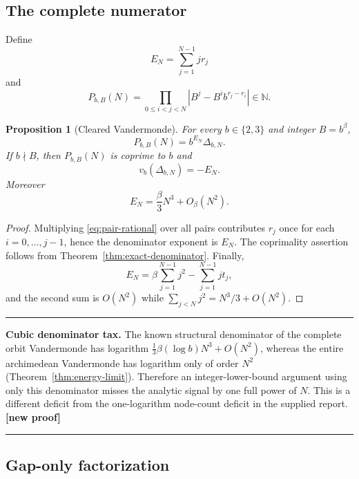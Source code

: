 \documentclass[11pt,oneside]{article}
\newtheorem{proposition}[theorem]{Proposition}
\theoremstyle{definition}
\theoremstyle{remark}
\newcommand{\N}{\mathbb N}
\newcommand{\vpp}[2]{v_{#1}\!\left(#2\right)}
\newcommand{\statusnew}{\textcolor{deepgreen}{\textbf{[new proof]}}}
\newenvironment{resultbox}
  {\begin{center}\begin{minipage}{0.93\textwidth}\hrule\vspace{0.65em}}
  {\vspace{0.45em}\hrule\end{minipage}\end{center}}
\begin{document}
\subsection{The complete numerator}

Define
\begin{equation}
 E_N=\sum_{j=1}^{N-1}j r_j
 \label{eq:EN}
\end{equation}
and
\begin{equation}
 P_{b,B}(N)=
 \prod_{0\le i<j<N}|B^j-B^i b^{r_j-r_i}|\in\N.
 \label{eq:P}
\end{equation}

\begin{proposition}[Cleared Vandermonde]
\label{prop:cleared-vdm}
For every $b\in\{2,3\}$ and integer $B=b^\beta$,
\begin{equation}
 P_{b,B}(N)=b^{E_N}\Delta_{b,N}.
 \label{eq:P-Delta}
\end{equation}
If $b\nmid B$, then $P_{b,B}(N)$ is coprime to $b$ and
\[
 \vpp{b}{\Delta_{b,N}}=-E_N.
\]
Moreover
\begin{equation}
 E_N=\frac{\beta}{3}N^3+O_\beta(N^2).
 \label{eq:EN-asymp}
\end{equation}
\end{proposition}

\begin{proof}
Multiplying \eqref{eq:pair-rational} over all pairs contributes $r_j$ once for each
$i=0,\ldots,j-1$, hence the denominator exponent is $E_N$.  The coprimality assertion follows
from Theorem~\ref{thm:exact-denominator}.  Finally,
\[
 E_N=\beta\sum_{j=1}^{N-1}j^2-\sum_{j=1}^{N-1}j t_j,
\]
and the second sum is $O(N^2)$ while $\sum_{j<N}j^2=N^3/3+O(N^2)$.
\end{proof}

\begin{resultbox}
\textbf{Cubic denominator tax.}  The known structural denominator of the complete orbit
Vandermonde has logarithm $\frac13\beta(\log b)N^3+O(N^2)$, whereas the entire archimedean
Vandermonde has logarithm only of order $N^2$ (Theorem~\ref{thm:energy-limit}).  Therefore an
integer-lower-bound argument using only this denominator misses the analytic signal by one full
power of $N$.  This is a different deficit from the one-logarithm node-count deficit in the
supplied report.  \statusnew
\end{resultbox}

\subsection{Gap-only factorization}
\end{document}
